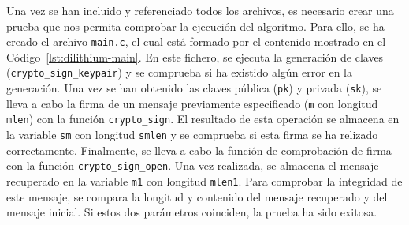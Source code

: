Una vez se han incluido y referenciado todos los archivos, es necesario crear una prueba que nos permita comprobar la ejecución del algoritmo.
Para ello, se ha creado el archivo \texttt{main.c}, el cual está formado por el contenido mostrado en el Código~\ref{lst:dilithium-main}.
En este fichero, se ejecuta la generación de claves (\texttt{crypto\_sign\_keypair}) y se comprueba si ha existido algún error en la generación.
Una vez se han obtenido las claves pública (\texttt{pk}) y privada (\texttt{sk}), se lleva a cabo la firma de un mensaje previamente especificado (\texttt{m} con longitud \texttt{mlen}) con la función \texttt{crypto\_sign}.
El resultado de esta operación se almacena en la variable \texttt{sm} con longitud \texttt{smlen} y se comprueba si esta firma se ha relizado correctamente.
Finalmente, se lleva a cabo la función de comprobación de firma con la función \texttt{crypto\_sign\_open}.
Una vez realizada, se almacena el mensaje recuperado en la variable \texttt{m1} con longitud \texttt{mlen1}.
Para comprobar la integridad de este mensaje, se compara la longitud y contenido del mensaje recuperado y del mensaje inicial.
Si estos dos parámetros coinciden, la prueba ha sido exitosa.

